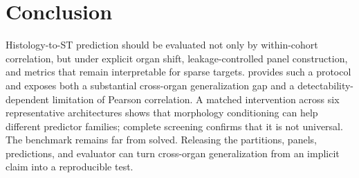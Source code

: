 \section{Conclusion}
Histology-to-ST prediction should be evaluated not only by within-cohort correlation, but under explicit
organ shift, leakage-controlled panel construction, and metrics that remain interpretable for sparse
targets. \coast{} provides such a protocol and exposes both a substantial cross-organ generalization
gap and a detectability-dependent limitation of Pearson correlation. A matched intervention across
six representative architectures shows that morphology conditioning can help different predictor
families; complete screening confirms that it is not universal. The benchmark remains far from solved. Releasing the
partitions, panels, predictions, and evaluator can turn cross-organ generalization from an implicit
claim into a reproducible test.
